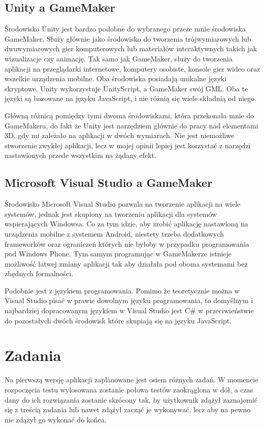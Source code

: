 \documentclass[openright]{xmgr}
\begin{document}
\subsection{Unity a GameMaker}
Środowisko Unity jest bardzo podobne do wybranego przeze mnie środowiska GameMaker. Służy głównie jako środowisko do tworzenia trójwymiarowych lub dwuwymiarowych gier komputerowych lub materiałów interaktywnych takich jak wizualizacje czy animację. Tak samo jak GameMaker, służy do tworzenia aplikacji na przeglądarki internetowe, komputery osobiste, konsole gier wideo oraz wszelkie urządzenia mobilne. Oba środowiska posiadają unikalne języki skryptowe. Unity wykorzystuje UnityScript, a GameMaker swój GML. Oba te języki są bazowane na języku JavaScript, i nie różnią się wiele składnią od niego. 

Główną różnicą pomiędzy tymi dwoma środowiskami, która przekonała mnie do GameMakera, do fakt że Unity jest narzędziem głównie do pracy nad elementami 3D, gdy mi zależało na aplikacji w dwóch wymiarach. Nie jest niemożliwe stworzenie zwykłej aplikacji, lecz w mojej opinii lepiej jest korzystać z narzędzi nastawionych przede wszystkim na żądany efekt.

\subsection{Microsoft Visual Studio a GameMaker}
Środowisko Microsoft Visual Studio pozwala na tworzenie aplikacji na wiele systemów, jednak jest skupiony na tworzeniu aplikacji dla systemów wspierających Windowsa. Co za tym idzie, aby zrobić aplikację nastawioną na urządzenia mobilne z systemem Android, niestety trzeba dodatkowych frameworków oraz ograniczeń których nie byłoby w przypadku programowania pod Windows Phone. Tym samym programując w GameMakerze istnieje możliwość łatwej zmiany aplikacji tak aby działała pod oboma systemami bez zbędnych formalności.

Podobnie jest z językiem programowania. Pomimo że teoretycznie można w Visual Studio pisać w prawie dowolnym języku programowania, to domyślnym i najbardziej dopracowanym językiem w Visual Studio jest C\# w przeciwieństwie do pozostałych dwóch środowisk które skupiają się na języku JavaScript. 



\section{Zadania}
Na pierwszą wersję aplikacji zaplanowane jest osiem różnych zadań. W momencie rozpoczęcia testu wylosowana zostanie połowa testów zaokrąglona w dół, a czas dany do ich rozwiązania zostanie skrócony tak, by użytkownik zdążył zaznajomić się z treścią zadania lub nawet zdążył zacząć je wykonywać, lecz aby na pewno nie zdążył go wykonać do końca.
\end{document}
